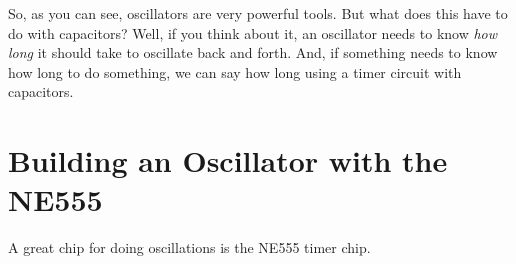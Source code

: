 So, as you can see, oscillators are very powerful tools.
But what does this have to do with capacitors?
Well, if you think about it, an oscillator needs to know \emph{how long} it should take to oscillate back and forth.
And, if something needs to know how long to do something, we can say how long using a timer circuit with capacitors.

\section{Building an Oscillator with the NE555}

A great chip for doing oscillations is the NE555 timer chip.
